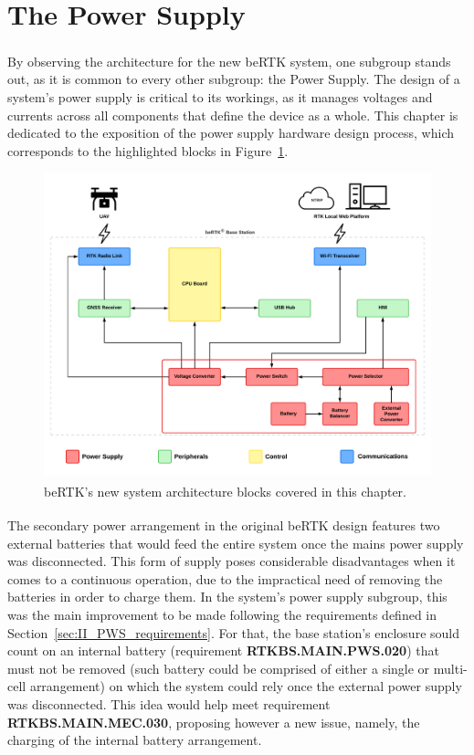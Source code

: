 \section{The Power Supply}\label{sec:32_PowerSupply}

By observing the architecture for the new beRTK\textsuperscript{\textregistered} system, one subgroup stands out, as it is common to every other subgroup: the Power Supply. The design of a system's power supply is critical to its workings, as it manages voltages and currents across all components that define the device as a whole. This chapter is dedicated to the exposition of the power supply hardware design process, which corresponds to the highlighted blocks in Figure~\ref{fig:architecture_new_PS}.

\begin{figure}[h]
	\centering
	\includegraphics[width=1.0\textwidth]{Chapters/Figures/chapter3/Chapter3_bloackDiagram.pdf}
	\caption{beRTK\textsuperscript{\textregistered}'s new system architecture blocks covered in this chapter.}
	\label{fig:architecture_new_PS}
\end{figure}

The secondary power arrangement in the original beRTK\textsuperscript{\textregistered} design features two external batteries that would feed the entire system once the mains power supply was disconnected. This form of supply poses considerable disadvantages when it comes to a continuous operation, due to the impractical need of removing the batteries in order to charge them. In the system's power supply subgroup, this was the main improvement to be made following the requirements defined in Section~\ref{sec:II_PWS_requirements}. For that, the base station's enclosure sould count on an internal battery (requirement \textbf{RTKBS.MAIN.PWS.020}) that must not be removed (such battery could be comprised of either a single or multi-cell arrangement) on which the system could rely once the external power supply was disconnected. This idea would help meet requirement \textbf{RTKBS.MAIN.MEC.030}, proposing however a new issue, namely, the charging of the internal battery arrangement.

